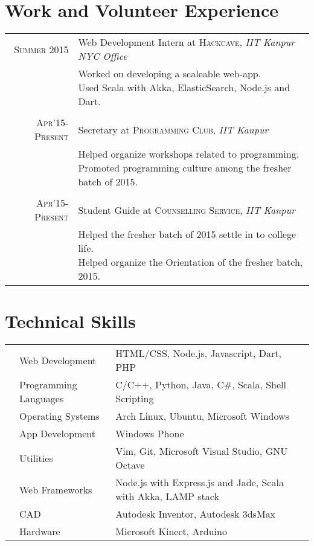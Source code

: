 \documentclass[11pt,a4paper]{article}
\begin{document}
\section*{Work and Volunteer Experience}
\begin{tabular}{r|p{11cm}}
\textsc{Summer 2015} & Web Development Intern at \textsc{Hackcave}, \emph{IIT Kanpur NYC Office}\\
&\footnotesize{Worked on developing a scaleable web-app. \newline Used Scala with Akka, ElasticSearch, Node.js and Dart.}\\\multicolumn{2}{c}{} \\

\textsc{Apr'15-Present} & Secretary at \textsc{Programming Club}, \emph{IIT Kanpur}\\
&\footnotesize{Helped organize workshops related to programming. \newline Promoted programming culture among the fresher batch of 2015.}\\\multicolumn{2}{c}{} \\

\textsc{Apr'15-Present} & Student Guide at \textsc{Counselling Service}, \emph{IIT Kanpur}\\
&\footnotesize{Helped the fresher batch of 2015 settle in to college life. \newline Helped organize the Orientation of the fresher batch, 2015.}

\end{tabular}

\vspace{5mm}


\section*{Technical Skills}
\begin{tabular}{L{0.05cm} L{5cm} l}
&Web Development 	        &HTML/CSS, Node.js, Javascript, Dart, PHP \\
&Programming Languages      &C/C++, Python, Java, C\#, Scala, Shell Scripting\\
&Operating Systems	        &Arch Linux, Ubuntu, Microsoft Windows\\
&App Development		    &Windows Phone\\
&Utilities                  &Vim, Git, Microsoft Visual Studio, GNU Octave\\
&Web Frameworks             &Node.js with Express.js and Jade, Scala with Akka, LAMP stack\\
&CAD	                	&Autodesk Inventor, Autodesk 3dsMax\\
&Hardware                   &Microsoft Kinect, Arduino\\

\end{tabular}\\
\end{document}
